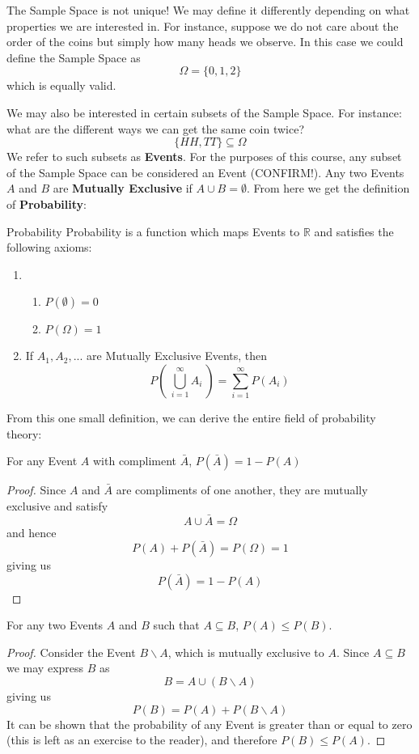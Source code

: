 \documentclass{report}
\begin{document}
\begin{notsofast}
The Sample Space is not unique! We may define it differently depending on what properties we are interested in. For instance, suppose we do not care about the order of the coins but simply how many heads we observe. In this case we could define the Sample Space as
\[
    \Omega=\{0,1,2\}
\]
which is equally valid.
\end{notsofast}
We may also be interested in certain subsets of the Sample Space. For instance: what are the different ways we can get the same coin twice?
\[
    \{HH,TT\}\subseteq \Omega
\]
We refer to such subsets as \textbf{Events}. For the purposes of this course, any subset of the Sample Space can be considered an Event (\todo CONFIRM!). Any two Events $A$ and $B$ are \textbf{Mutually Exclusive} if $A\cup B=\emptyset$. From here we get the definition of \textbf{Probability}:
\begin{definition}{Probability}
Probability is a function which maps Events to $\mathbb R$ and satisfies the following axioms:
\begin{enumerate}
    \item 
    \begin{enumerate}
        \item $P(\emptyset) = 0$
        \item $P(\Omega)=1$
    \end{enumerate}
    \item If $A_1, A_2,...$ are Mutually Exclusive Events, then
    \[
        P\left(\ \bigcup_{i=1}^\infty A_i\ \right) = \sum_{i=1}^\infty P(A_i)
    \]
\end{enumerate}
\end{definition}
\label{def:probability}
From this one small definition, we can derive the entire field of probability theory:

\begin{lemma}
    For any Event $A$ with compliment $\bar A$, $P(\bar A)=1-P(A)$
\tcblower
\begin{proof}
    Since $A$ and $\bar A$ are compliments of one another, they are mutually exclusive and satisfy
    \[
        A\cup \bar A = \Omega
    \]
    and hence
    \[
        P(A)+P(\bar A) = P(\Omega) = 1
    \]
    giving us
    \[
        P(\bar A)=1-P(A)
    \]
\end{proof}
\end{lemma}

\begin{lemma}
    For any two Events $A$ and $B$ such that $A\subseteq B$, $P(A)\le P(B)$.
    \tcblower
    \begin{proof}
    Consider the Event $B\backslash A$, which is mutually exclusive to $A$. Since $A\subseteq B$ we may express $B$ as
    \[
        B=A\cup (B\backslash A)
    \]
    giving us
    \[
        P(B)=P(A)+P(B\backslash A)
    \]
    It can be shown that the probability of any Event is greater than or equal to zero (this is left as an exercise to the reader), and therefore $P(B)\le P(A)$.
    \end{proof}
\end{lemma}
\end{document}
